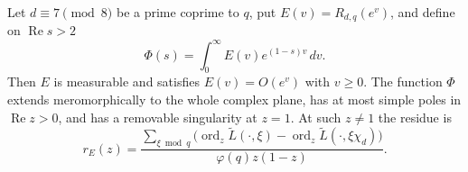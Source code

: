 \begin{lemma}
\label{lem:prime-transform}
\emitthmsource
Let $d\equiv7\pmod8$ be a prime coprime to $q$, put $E(v)=R_{d,q}(e^v)$, and define on $\operatorname{Re}s>2$
\[
 \Phi(s)=\int_0^\infty E(v)e^{(1-s)v}\,dv.
\]
Then $E$ is measurable and satisfies $E(v)=O(e^v)$ with $v\ge0$. The function $\Phi$ extends meromorphically to the whole complex plane, has at most simple poles in $\operatorname{Re}z>0$, and has a removable singularity at $z=1$. At such $z\ne1$ the residue is
\begin{equation}\label{eq:prime-transform-residue}
 r_E(z)=\frac{\sum_{\xi\bmod q}
  \bigl(\operatorname{ord}_z\widetilde L(\cdot,\xi)
       -\operatorname{ord}_z\widetilde L(\cdot,\xi\chi_d)\bigr)}
  {\varphi(q)z(1-z)}.
\end{equation}
\end{lemma}
